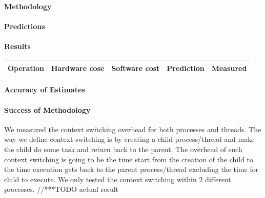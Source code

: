 \paragraph{Methodology}
\paragraph{Predictions}
\paragraph{Results}

\begin{tabular}{| l | l | l | l | l |}
\hline
Operation & Hardware cose & Software cost & Prediction & Measured \\
\hline
\end{tabular}
\paragraph{Accuracy of Estimates}
\paragraph{Success of Methodology}
We measured the context switching overhead for both processes and threads. The way we define context switching is by creating a child process/thread and make the child do some task and return back to the parent. The overhead of such context switching is going to be the time start from the creation of the child to the time execution gets back to the parent process/thread excluding the time for child to execute. We only tested the context switching within 2 different processes.
//***TODO actual result

